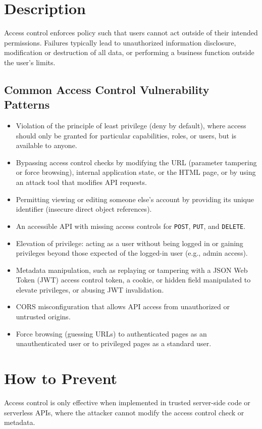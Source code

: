 \documentclass[11pt]{article}
\begin{document}
\section{Description}
Access control enforces policy such that users cannot act outside of their intended permissions. Failures typically lead to unauthorized information disclosure, modification or destruction of all data, or performing a business function outside the user's limits.

\subsection{Common Access Control Vulnerability Patterns}
\begin{itemize}
  \item Violation of the principle of least privilege (deny by default), where access should only be granted for particular capabilities, roles, or users, but is available to anyone.
  \item Bypassing access control checks by modifying the URL (parameter tampering or force browsing), internal application state, or the HTML page, or by using an attack tool that modifies API requests.
  \item Permitting viewing or editing someone else's account by providing its unique identifier (insecure direct object references).
  \item An accessible API with missing access controls for \texttt{POST}, \texttt{PUT}, and \texttt{DELETE}.
  \item Elevation of privilege: acting as a user without being logged in or gaining privileges beyond those expected of the logged-in user (e.g., admin access).
  \item Metadata manipulation, such as replaying or tampering with a JSON Web Token (JWT) access control token, a cookie, or hidden field manipulated to elevate privileges, or abusing JWT invalidation.
  \item CORS misconfiguration that allows API access from unauthorized or untrusted origins.
  \item Force browsing (guessing URLs) to authenticated pages as an unauthenticated user or to privileged pages as a standard user.
\end{itemize}

\section{How to Prevent}
Access control is only effective when implemented in trusted server-side code or serverless APIs, where the attacker cannot modify the access control check or metadata.
\end{document}
